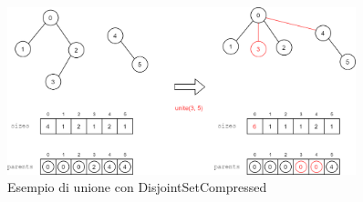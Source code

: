 \begin{figure}[h]
	\centering
	\includegraphics[width=0.9\textwidth]{./images/DisjointSetCompressedExample.png}
	\caption{Esempio di unione con DisjointSetCompressed}
	\label{fig:disjoint-set-compressed-union-example}
\end{figure}
